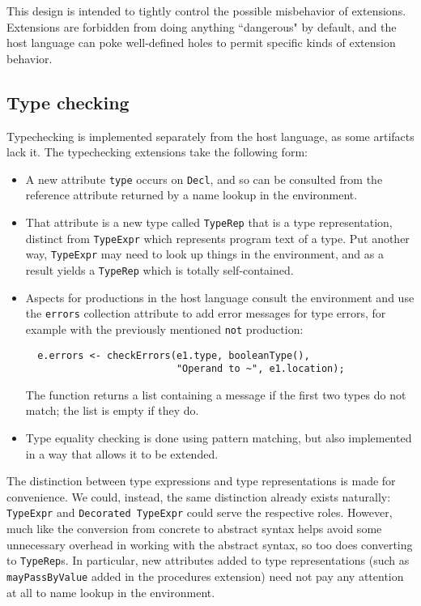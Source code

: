 This design is intended to tightly control the possible misbehavior of
extensions.
%
Extensions are forbidden from doing anything ``dangerous" by default,
and the host language can poke well-defined holes to permit specific
kinds of extension behavior.


\subsection{Type checking}

Typechecking is implemented separately from the host language, as some artifacts
lack it.
%
The typechecking extensions take the following form:
\begin{itemize}
\item A new attribute \texttt{type} occurs on \texttt{Decl}, and so can be
 consulted from the reference attribute returned by a name lookup in the
 environment.
\item That attribute is a new type called \texttt{TypeRep} that is a type
 representation, distinct from \texttt{TypeExpr} which represents program
 text of a type. Put another way, \texttt{TypeExpr} may need to look up things
 in the environment, and as a result yields a \texttt{TypeRep} which is totally
 self-contained.
\item Aspects for productions in the host language consult the environment
 and use the \texttt{errors} collection attribute to add error messages
 for type errors, for example with the previously mentioned \texttt{not} production:
\begin{verbatim}
  e.errors <- checkErrors(e1.type, booleanType(), 
                          "Operand to ~", e1.location);
\end{verbatim}
The function  returns a list containing a message if
the first two types do not match; the list is empty if they do.

\item Type equality checking is done using pattern matching, but also implemented
 in a way that allows it to be extended.
\end{itemize}

The distinction between type expressions and type representations is made for
convenience.
%
We could, instead, the same distinction already exists naturally:
\texttt{TypeExpr} and \texttt{Decorated TypeExpr} could serve the respective
roles.
%
However, much like the conversion from concrete to abstract syntax helps
avoid some unnecessary overhead in working with the abstract syntax, so
too does converting to \texttt{TypeRep}s.
%
In particular, new attributes added to type representations
(such as \texttt{mayPassByValue} added in the procedures extension) need not pay
any attention at all to name lookup in the environment.

